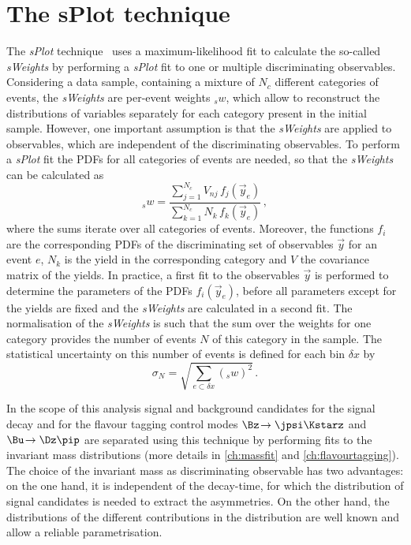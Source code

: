 \section{The sPlot technique}
\label{sec:splot}

The \emph{sPlot} technique~\cite{Pivk:2004ty} uses a maximum-likelihood fit to calculate the so-called \emph{sWeights} by performing a \emph{sPlot} fit to one or multiple discriminating observables.
Considering a data sample, containing a mixture of $N_c$ different categories of events, the \emph{sWeights} are per-event weights ${}_sw$, which allow to reconstruct the distributions of variables separately for each category present in the initial sample.
However, one important assumption is that the \emph{sWeights} are applied to observables, which are independent of the discriminating observables.
To perform a \emph{sPlot} fit the PDFs for all categories of events are needed, so that the \emph{sWeights} can be calculated as
\begin{equation}
{}_sw=\frac{\sum_{j=1}^{N_c}V_{nj}\,f_j(\vec{y}_e)}{\sum_{k=1}^{N_c}N_k\,f_k(\vec{y}_e)}\,,
\end{equation}
where the sums iterate over all categories of events.
Moreover, the functions $f_i$ are the corresponding PDFs of the discriminating set of observables $\vec{y}$ for an event $e$, $N_k$ is the yield in the corresponding category and $V$ the covariance matrix of the yields.
In practice, a first fit to the observables $\vec{y}$ is performed to determine the parameters of the PDFs $f_i(\vec{y}_e)$, before all parameters except for the yields are fixed and the \emph{sWeights} are calculated in a second fit.
The normalisation of the \emph{sWeights} is such that the sum over the weights for one category provides the number of events $N$ of this category in the sample.
The statistical uncertainty on this number of events is defined for each bin $\delta x$ by
\begin{equation}
\sigma_N=\sqrt{\sum_{e\subset\delta x}({}_sw)^2}\,.
\end{equation}

In the scope of this analysis signal and background candidates for the signal decay \mbox{\BdToDpi} and for the flavour tagging control modes $\Bz\!\to\jpsi\Kstarz$ and $\Bu\!\to\Dz\pip$ are separated using this technique by performing fits to the invariant mass distributions (more details in \cref{ch:massfit} and \cref{ch:flavourtagging}).
The choice of the invariant mass as discriminating observable has two advantages:
on the one hand, it is independent of the decay-time, for which the distribution of signal candidates is needed to \eg extract the \CP asymmetries.
On the other hand, the distributions of the different contributions in the distribution are well known and allow a reliable parametrisation.
